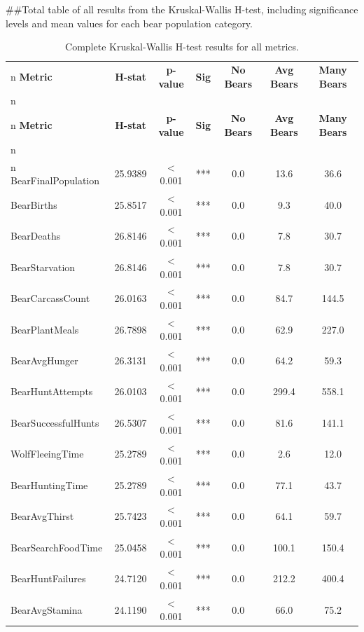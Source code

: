 ##Total table of all results from the Kruskal-Wallis H-test, including significance levels and mean values for each bear population category.


\begin{longtable}[]{@{}lcccccc@{}}
\caption{Complete Kruskal-Wallis H-test results for all metrics.}\label{tab:significance_full} \\n\toprule
\textbf{Metric} & \textbf{H-stat} & \textbf{p-value} & \textbf{Sig} & \textbf{No Bears} & \textbf{Avg Bears} & \textbf{Many Bears} \\n\midrule
\endfirsthead
\multicolumn{7}{@{}l}{\textit{Table \ref{tab:significance_full} continued}} \\n\toprule
\textbf{Metric} & \textbf{H-stat} & \textbf{p-value} & \textbf{Sig} & \textbf{No Bears} & \textbf{Avg Bears} & \textbf{Many Bears} \\n\midrule
\endhead
\midrule
\multicolumn{7}{r}{\textit{Continued on next page}} \\n\endfoot
\bottomrule
\endlastfoot
BearFinalPopulation & 25.9389 & < 0.001 & *** & 0.0 & 13.6 & 36.6 \\
BearBirths & 25.8517 & < 0.001 & *** & 0.0 & 9.3 & 40.0 \\
BearDeaths & 26.8146 & < 0.001 & *** & 0.0 & 7.8 & 30.7 \\
BearStarvation & 26.8146 & < 0.001 & *** & 0.0 & 7.8 & 30.7 \\
BearCarcassCount & 26.0163 & < 0.001 & *** & 0.0 & 84.7 & 144.5 \\
BearPlantMeals & 26.7898 & < 0.001 & *** & 0.0 & 62.9 & 227.0 \\
BearAvgHunger & 26.3131 & < 0.001 & *** & 0.0 & 64.2 & 59.3 \\
BearHuntAttempts & 26.0103 & < 0.001 & *** & 0.0 & 299.4 & 558.1 \\
BearSuccessfulHunts & 26.5307 & < 0.001 & *** & 0.0 & 81.6 & 141.1 \\
WolfFleeingTime & 25.2789 & < 0.001 & *** & 0.0 & 2.6 & 12.0 \\
BearHuntingTime & 25.2789 & < 0.001 & *** & 0.0 & 77.1 & 43.7 \\
BearAvgThirst & 25.7423 & < 0.001 & *** & 0.0 & 64.1 & 59.7 \\
BearSearchFoodTime & 25.0458 & < 0.001 & *** & 0.0 & 100.1 & 150.4 \\
BearHuntFailures & 24.7120 & < 0.001 & *** & 0.0 & 212.2 & 400.4 \\
BearAvgStamina & 24.1190 & < 0.001 & *** & 0.0 & 66.0 & 75.2 \\

\end{longtable}
